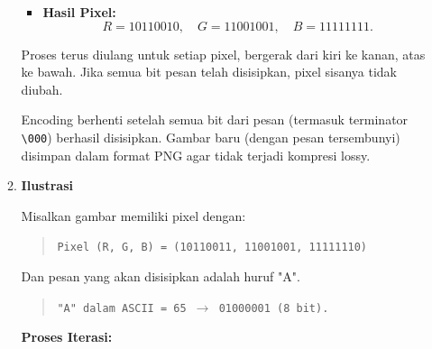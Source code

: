 \documentclass{ittelkom}
\begin{document}
\begin{enumerate}
\begin{enumerate}
\begin{itemize}
                        \item \textbf{Hasil Pixel:}
                              \[
                                  R = 10110010, \quad G = 11001001, \quad B = 11111111.
                              \]
                    \end{itemize}

                    Proses terus diulang untuk setiap pixel, bergerak dari kiri ke kanan, atas ke
                    bawah. Jika semua bit pesan telah disisipkan, pixel sisanya tidak diubah.

                    Encoding berhenti setelah semua bit dari pesan (termasuk terminator
                    \texttt{\textbackslash 000}) berhasil disisipkan. Gambar baru (dengan pesan
                    tersembunyi) disimpan dalam format PNG agar tidak terjadi kompresi lossy.
              \item \textbf{Ilustrasi}

                    Misalkan gambar memiliki pixel dengan:

                    \begin{quote}
                        \texttt{Pixel (R, G, B) = (10110011, 11001001, 11111110)}
                    \end{quote}

                    Dan pesan yang akan disisipkan adalah huruf "A".

                    \begin{quote}
                        \texttt{"A" dalam ASCII = 65 $\rightarrow$ 01000001 (8 bit).}
                    \end{quote}

                    \textbf{Proses Iterasi:}


\end{enumerate}
\end{enumerate}
\end{document}
